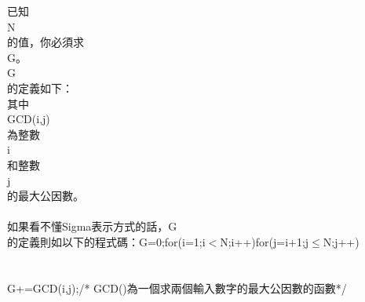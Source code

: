 已知\\
N\\
的值，你必須求\\
G。\\
G\\
的定義如下：\\
其中\\
GCD(i,j)\\
為整數\\
i\\
和整數\\
j\\
的最大公因數。\\
\\
如果看不懂Sigma表示方式的話，G\\
的定義則如以下的程式碼：G=0;for(i=1;i$<$N;i++)for(j=i+1;j$\leq$N;j++){\\
\\
\\
 G+=GCD(i,j);}/* GCD()為一個求兩個輸入數字的最大公因數的函數*/